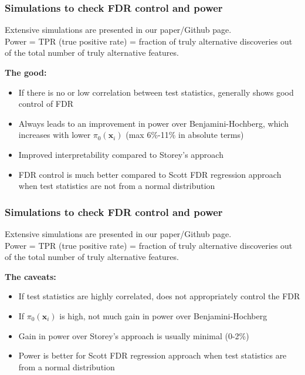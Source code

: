 \documentclass{beamer}
\newcommand{\bx}{\mathbf{x}}
\begin{document}

\begin{frame}
\frametitle{Simulations to check FDR control and power}

Extensive simulations are presented in our paper/Github page.\\ \vspace{0.2cm}
Power = TPR (true positive rate) = fraction of truly alternative discoveries out of the total number of truly alternative features. \\
\vspace{0.5cm}

\textbf{The good:}

\begin{itemize}
\item If there is no or low correlation between test statistics, generally shows good control of FDR
\item Always leads to an improvement in power over Benjamini-Hochberg, which increases with lower $\pi_0(\bx_i)$ (max 6\%-11\% in absolute terms)
\item Improved interpretability compared to Storey's approach
\item FDR control is much better compared to Scott FDR regression approach when test statistics are not from a normal distribution
\end{itemize}

\end{frame}


\begin{frame}
\frametitle{Simulations to check FDR control and power}

Extensive simulations are presented in our paper/Github page.\\ \vspace{0.2cm}
Power = TPR (true positive rate) = fraction of truly alternative discoveries out of the total number of truly alternative features. \\
\vspace{0.5cm}

\textbf{The caveats:}

\begin{itemize}
\item If test statistics are highly correlated, does not appropriately control the FDR
\item If $\pi_0(\bx_i)$ is high, not much gain in power over Benjamini-Hochberg
\item Gain in power over Storey's approach is usually minimal (0-2\%)
\item Power is better for Scott FDR regression approach when test statistics are from a normal distribution
\end{itemize}

\end{frame}
\end{document}

